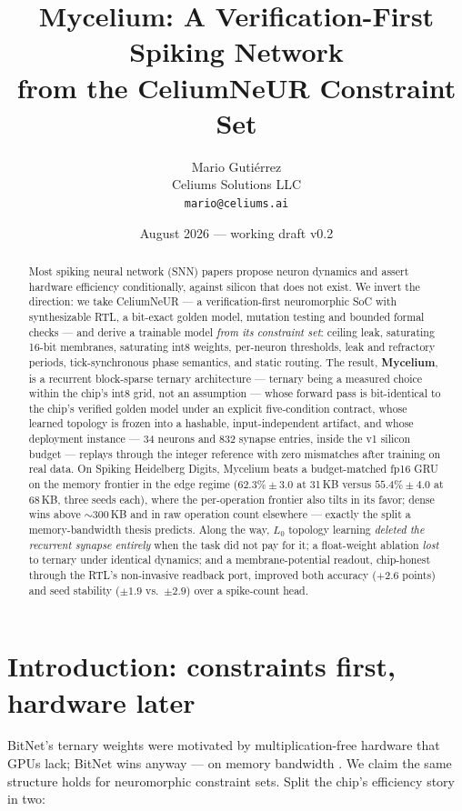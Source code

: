 \documentclass[11pt]{article}
\title{\textbf{Mycelium: A Verification-First Spiking Network\\from the CeliumNeUR Constraint Set}}
\author{Mario Guti\'errez\\Celiums Solutions LLC\\\texttt{mario@celiums.ai}}
\date{August 2026 --- working draft v0.2}
\begin{document}
\maketitle

\begin{abstract}
Most spiking neural network (SNN) papers propose neuron dynamics and assert
hardware efficiency conditionally, against silicon that does not exist. We
invert the direction: we take CeliumNeUR --- a verification-first neuromorphic
SoC with synthesizable RTL, a bit-exact golden model, mutation testing and
bounded formal checks --- and derive a trainable model \emph{from its
constraint set}: ceiling leak, saturating 16-bit membranes, saturating
int8 weights, per-neuron thresholds, leak and refractory periods, tick-synchronous
phase semantics, and static routing. The result, \textbf{Mycelium}, is a
recurrent block-sparse ternary architecture --- ternary being a measured
choice within the chip's int8 grid, not an assumption --- whose forward pass is bit-identical
to the chip's verified golden model under an explicit five-condition contract,
whose learned topology is frozen into a hashable, input-independent artifact,
and whose deployment instance --- 34 neurons and 832 synapse entries, inside
the v1 silicon budget --- replays through the integer reference with zero
mismatches after training on real data. On Spiking Heidelberg Digits, Mycelium
beats a budget-matched fp16 GRU on the memory frontier in the edge regime
($62.3\% \pm 3.0$ at 31\,KB versus $55.4\% \pm 4.0$ at 68\,KB, three seeds
each), where the per-operation frontier also tilts in its favor; dense wins
above ${\sim}300$\,KB and in raw operation count elsewhere --- exactly the
split a memory-bandwidth thesis predicts. Along the way, $L_0$ topology
learning \emph{deleted the recurrent synapse entirely} when the task did not
pay for it; a float-weight ablation \emph{lost} to ternary under identical
dynamics; and a membrane-potential readout, chip-honest through the RTL's
non-invasive readback port, improved both accuracy ($+2.6$ points) and seed
stability ($\pm 1.9$ vs.\ $\pm 2.9$) over a spike-count head.
\end{abstract}

\section{Introduction: constraints first, hardware later}

BitNet's ternary weights were motivated by multiplication-free hardware that
GPUs lack; BitNet wins anyway --- on memory bandwidth
\cite{ma2024bitnet}. We claim the same structure holds for neuromorphic
constraint sets. Split the chip's efficiency story in two:
\end{document}
